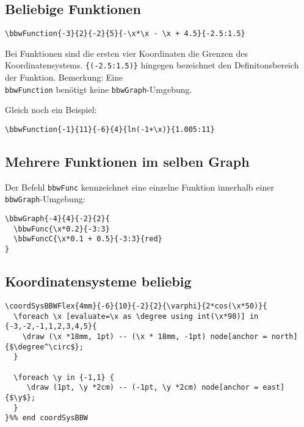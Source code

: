 \subsection{Beliebige Funktionen}
\begin{verbatim}
\bbwFunction{-3}{2}{-2}{5}{-\x*\x - \x + 4.5}{-2.5:1.5}
\end{verbatim}

Bei Funktionen sind die ersten vier Koordinaten die Grenzen des Koordinatensystems. \texttt{\{(-2.5:1.5)\}} hingegen bezeichnet den Definitonsbereich der Funktion.
Bemerkung: Eine \texttt{\\bbwFunction} benötigt
keine \texttt{bbwGraph}-Umgebung.
\newpage

Gleich noch ein Beispiel:

\begin{verbatim}
\bbwFunction{-1}{11}{-6}{4}{ln(-1+\x)}{1.005:11}
\end{verbatim}
\newpage


\subsection{Mehrere Funktionen im selben Graph}
Der Befehl \texttt{bbwFunc} kennzeichnet eine einzelne Funktion
innerhalb einer \texttt{bbwGraph}-Umgebung:

\begin{verbatim}
\bbwGraph{-4}{4}{-2}{2}{
  \bbwFunc{\x*0.2}{-3:3}
  \bbwFuncC{\x*0.1 + 0.5}{-3:3}{red}
}
\end{verbatim}


\subsection{Koordinatensysteme beliebig}

\begin{verbatim}
\coordSysBBWFlex{4mm}{-6}{10}{-2}{2}{\varphi}{2*cos(\x*50)}{
  \foreach \x [evaluate=\x as \degree using int(\x*90)] in {-3,-2,-1,1,2,3,4,5}{ 
    \draw (\x *18mm, 1pt) -- (\x * 18mm, -1pt) node[anchor = north] {$\degree^\circ$};
  }
   
  \foreach \y in {-1,1} {
     \draw (1pt, \y *2cm) -- (-1pt, \y *2cm) node[anchor = east] {$\y$};
  }
}%% end coordSysBBW

\end{verbatim}

